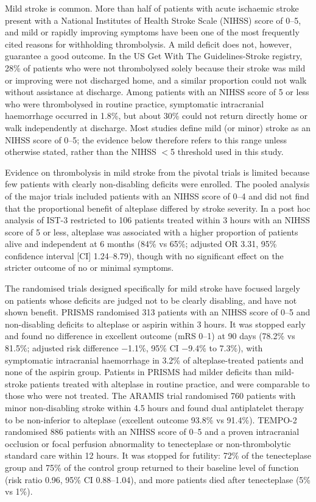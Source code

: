 Mild stroke is common. More than half of patients with acute ischaemic stroke present with a National Institutes of Health Stroke Scale (NIHSS) score of 0--5,\cite{khatri2018} and mild or rapidly improving symptoms have been one of the most frequently cited reasons for withholding thrombolysis.\cite{smith2011} A mild deficit does not, however, guarantee a good outcome. In the US Get With The Guidelines-Stroke registry, 28\% of patients who were not thrombolysed solely because their stroke was mild or improving were not discharged home, and a similar proportion could not walk without assistance at discharge.\cite{smith2011} Among patients with an NIHSS score of 5 or less who were thrombolysed in routine practice, symptomatic intracranial haemorrhage occurred in 1.8\%, but about 30\% could not return directly home or walk independently at discharge.\cite{romano2015} Most studies define mild (or minor) stroke as an NIHSS score of 0--5; the evidence below therefore refers to this range unless otherwise stated, rather than the NIHSS $<$5 threshold used in this study.

Evidence on thrombolysis in mild stroke from the pivotal trials is limited because few patients with clearly non-disabling deficits were enrolled.\cite{khatri2018} The pooled analysis of the major trials included patients with an NIHSS score of 0--4 and did not find that the proportional benefit of alteplase differed by stroke severity.\cite{emberson2014} In a post hoc analysis of IST-3 restricted to 106 patients treated within 3 hours with an NIHSS score of 5 or less, alteplase was associated with a higher proportion of patients alive and independent at 6 months (84\% vs 65\%; adjusted OR 3.31, 95\% confidence interval [CI] 1.24--8.79), though with no significant effect on the stricter outcome of no or minimal symptoms.\cite{khatri2015}

The randomised trials designed specifically for mild stroke have focused largely on patients whose deficits are judged not to be clearly disabling, and have not shown benefit. PRISMS randomised 313 patients with an NIHSS score of 0--5 and non-disabling deficits to alteplase or aspirin within 3 hours. It was stopped early and found no difference in excellent outcome (mRS 0--1) at 90 days (78.2\% vs 81.5\%; adjusted risk difference $-$1.1\%, 95\% CI $-$9.4\% to 7.3\%), with symptomatic intracranial haemorrhage in 3.2\% of alteplase-treated patients and none of the aspirin group.\cite{khatri2018} Patients in PRISMS had milder deficits than mild-stroke patients treated with alteplase in routine practice, and were comparable to those who were not treated.\cite{asdaghi2021} The ARAMIS trial randomised 760 patients with minor non-disabling stroke within 4.5 hours and found dual antiplatelet therapy to be non-inferior to alteplase (excellent outcome 93.8\% vs 91.4\%).\cite{chen2023} TEMPO-2 randomised 886 patients with an NIHSS score of 0--5 and a proven intracranial occlusion or focal perfusion abnormality to tenecteplase or non-thrombolytic standard care within 12 hours. It was stopped for futility: 72\% of the tenecteplase group and 75\% of the control group returned to their baseline level of function (risk ratio 0.96, 95\% CI 0.88--1.04), and more patients died after tenecteplase (5\% vs 1\%).\cite{coutts2024}

